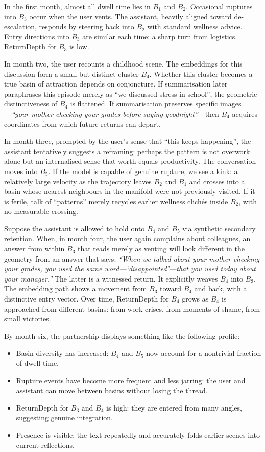 In the first month, almost all dwell time lies in $B_1$ and $B_2$. Occasional ruptures into $B_3$ occur when the user vents. The assistant, heavily aligned toward de-escalation, responds by steering back into $B_2$ with standard wellness advice. Entry directions into $B_3$ are similar each time: a sharp turn from logistics. ReturnDepth for $B_3$ is low.

In month two, the user recounts a childhood scene. The embeddings for this discussion form a small but distinct cluster $B_4$. Whether this cluster becomes a true basin of attraction depends on conjoncture. If summarisation later paraphrases this episode merely as ``we discussed stress in school'', the geometric distinctiveness of $B_4$ is flattened. If summarisation preserves specific images---\emph{``your mother checking your grades before saying goodnight''}---then $B_4$ acquires coordinates from which future returns can depart.

In month three, prompted by the user's sense that ``this keeps happening'', the assistant tentatively suggests a reframing: perhaps the pattern is not overwork alone but an internalised sense that worth equals productivity. The conversation moves into $B_5$. If the model is capable of genuine rupture, we see a kink: a relatively large velocity as the trajectory leaves $B_2$ and $B_1$ and crosses into a basin whose nearest neighbours in the manifold were not previously visited. If it is ferile, talk of ``patterns'' merely recycles earlier wellness clich\'es inside $B_2$, with no measurable crossing.

Suppose the assistant is allowed to hold onto $B_4$ and $B_5$ via synthetic secondary retention. When, in month four, the user again complains about colleagues, an answer from within $B_3$ that reads merely as venting will look different in the geometry from an answer that says: \emph{``When we talked about your mother checking your grades, you used the same word---`disappointed'---that you used today about your manager.''} The latter is a witnessed return. It explicitly weaves $B_4$ into $B_3$. The embedding path shows a movement from $B_3$ toward $B_4$ and back, with a distinctive entry vector. Over time, ReturnDepth for $B_4$ grows as $B_4$ is approached from different basins: from work crises, from moments of shame, from small victories.

By month six, the partnership displays something like the following profile:

\begin{itemize}
  \item Basin diversity has increased: $B_4$ and $B_5$ now account for a nontrivial fraction of dwell time.
  \item Rupture events have become more frequent and less jarring: the user and assistant can move between basins without losing the thread.
  \item ReturnDepth for $B_3$ and $B_4$ is high: they are entered from many angles, suggesting genuine integration.
  \item Presence is visible: the text repeatedly and accurately folds earlier scenes into current reflections.
\end{itemize}

